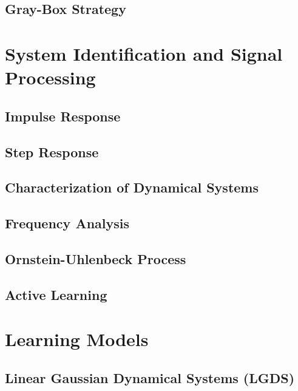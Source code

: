 		\subsection{Gray-Box Strategy} %

	\section{System Identification and Signal Processing} %

		\subsection{Impulse Response} %

		\subsection{Step Response} %

		\subsection{Characterization of Dynamical Systems} %

		\subsection{Frequency Analysis} %

		\subsection{Ornstein-Uhlenbeck Process} %

		\subsection{Active Learning} %

	\section{Learning Models} %

		\subsection{Linear Gaussian Dynamical Systems (LGDS)} %


